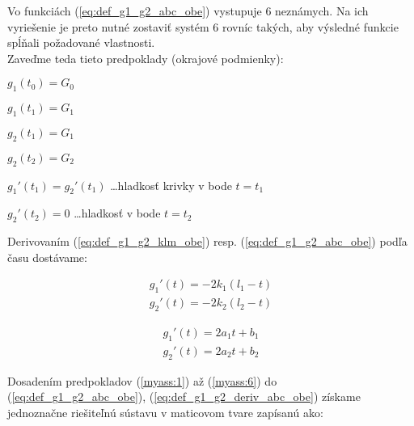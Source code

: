 Vo funkciách (\ref{eq:def_g1_g2_abc_obe}) vystupuje 6 neznámych. Na ich vyriešenie je preto nutné zostaviť systém 6 rovníc takých, aby výsledné funkcie spĺňali požadované vlastnosti.\\
Zaveďme teda tieto predpoklady (okrajové podmienky):
\begin{myass}
	$g_1(t_0) = G_0$
	\label{myass:1}
\end{myass}
\begin{myass}
	$g_1(t_1) = G_1$
	\label{myass:2}
\end{myass}
\begin{myass}
	$g_2(t_1) = G_1$
	\label{myass:3}
\end{myass}
\begin{myass}
	$g_2(t_2) = G_2$
	\label{myass:4}
\end{myass}
\begin{myass}
	$g_1'(t_1) = g_2'(t_1)$ \ldots hladkosť krivky v bode $t=t_1$
	\label{myass:5}
\end{myass}
\begin{myass}
	$g_2'(t_2)=0$ \ldots hladkosť v bode $t=t_2$
	\label{myass:6}
\end{myass}
\vspace{12pt}

Derivovaním (\ref{eq:def_g1_g2_klm_obe}) resp. (\ref{eq:def_g1_g2_abc_obe}) podľa času dostávame:

\begin{subequations} 
	\label{eq:def_g1_g2_deriv_klm_obe}
	\begin{align}
		g_1'(t) = -2 k_1 (l_1 -t) 	\label{eq:def_g1_g2_deriv_klm_1} \\
		g_2'(t) = -2 k_2 (l_2 -t) 	\label{eq:def_g1_g2_deriv_klm_2}
	\end{align}
\end{subequations}

\begin{subequations} 
	\label{eq:def_g1_g2_deriv_abc_obe}
	\begin{align}
		g_1'(t) = 2 a_1 t + b_1 	\label{eq:def_g1_g2_deriv_abc_1} \\
		g_2'(t) = 2 a_2 t + b_2 	\label{eq:def_g1_g2_deriv_abc_2}
	\end{align}
\end{subequations}

Dosadením predpokladov (\ref{myass:1}) až (\ref{myass:6}) do (\ref{eq:def_g1_g2_abc_obe}), (\ref{eq:def_g1_g2_deriv_abc_obe}) získame jednoznačne riešiteľnú sústavu v maticovom tvare zapísanú ako:

